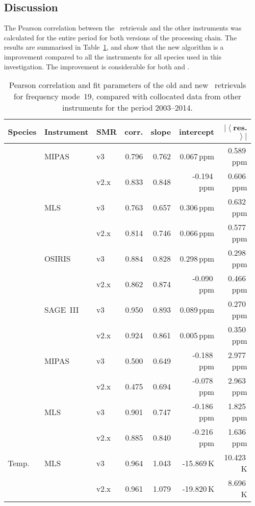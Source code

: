 \subsection{Discussion}
\label{sec:fm19:discussion}
The Pearson correlation between the \smr\ retrievals and the other instruments
was calculated for the entire period for both versions of the processing chain.
The results are summarised in Table~\ref{tab:fm19:stats}, and show that the
new algorithm is a improvement compared to all the instruments for all species
used in this investigation. The improvement is considerable for both 
and .


\begin{table}[hbt]
\centering
\caption{Pearson correlation and fit parameters of the old and new \smr\
retrievals for frequency mode~19, compared with collocated data from other
instruments for the period 2003--2014.
}
\label{tab:fm19:stats}
\begin{tabular}{lllrrrr}
    \toprule
    \textbf{Species} & \textbf{Instrument} & \textbf{SMR} & \textbf{corr.} & \textbf{slope} & \textbf{intercept} & \textbf{$\left|\left<\right.\right.$res.$\left.\left.\right>\right|$} \\
    \midrule
    \chem{O3}   & MIPAS     & v3    & 0.796 & 0.762 & 0.067\,ppm    & 0.589\,ppm \\
                &           & v2.x  & 0.833 & 0.848 & -0.194\,ppm   & 0.606\,ppm \\
    \cline{2-7}
                & MLS       & v3    & 0.763 & 0.657 & 0.306\,ppm    & 0.632\,ppm \\
                &           & v2.x  & 0.814 & 0.746 & 0.066\,ppm    & 0.577\,ppm \\
    \cline{2-7}
                & OSIRIS    & v3    & 0.884 & 0.828 & 0.298\,ppm    & 0.298\,ppm \\
                &           & v2.x  & 0.862 & 0.874 & -0.090\,ppm   & 0.466\,ppm \\
    \cline{2-7}
                & SAGE~III  & v3    & 0.950 & 0.893 & 0.089\,ppm    & 0.270\,ppm \\
                &           & v2.x  & 0.924 & 0.861 & 0.005\,ppm    & 0.350\,ppm \\
    \midrule
    \chem{H_2O} & MIPAS     & v3    & 0.500 & 0.649 & -0.188\,ppm   & 2.977\,ppm \\
                &           & v2.x  & 0.475 & 0.694 & -0.078\,ppm   & 2.963\,ppm \\
    \cline{2-7}
                & MLS       & v3    & 0.901 & 0.747 & -0.186\,ppm   & 1.825\,ppm \\
                &           & v2.x  & 0.885 & 0.840 & -0.216\,ppm   & 1.636\,ppm \\
    \midrule
    Temp.       & MLS       & v3    & 0.964 & 1.043 & -15.869\,K    & 10.423\,K \\
                &           & v2.x  & 0.961 & 1.079 & -19.820\,K    &  8.696\,K \\
    \bottomrule
\end{tabular}
\end{table}

